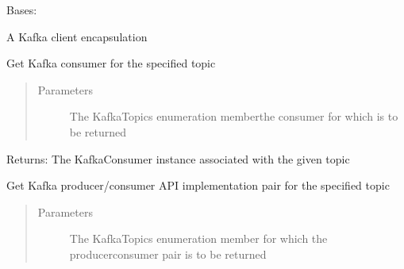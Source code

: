 \documentclass[letterpaper,10pt,english]{sphinxmanual}
\begin{document}

\begin{fulllineitems}
\label{\detokenize{Forge:Forge.KafkaClient}}
\sphinxAtStartPar
Bases: 

\sphinxAtStartPar
A Kafka client encapsulation

\begin{fulllineitems}
\label{\detokenize{Forge:Forge.KafkaClient.get_consumer}}
\sphinxAtStartPar
Get Kafka consumer for the specified topic
\begin{quote}\begin{description}
\item[{Parameters}] \leavevmode
\sphinxAtStartPar
{} \textendash{} The KafkaTopics enumeration member\textendash{}the consumer for which is to be returned

\end{description}\end{quote}

\sphinxAtStartPar
Returns: The KafkaConsumer instance associated with the given topic

\end{fulllineitems}


\begin{fulllineitems}
\label{\detokenize{Forge:Forge.KafkaClient.get_kafka_api_impl_pair}}
\sphinxAtStartPar
Get Kafka producer/consumer API implementation pair for the specified topic
\begin{quote}\begin{description}
\item[{Parameters}] \leavevmode
\sphinxAtStartPar
{} \textendash{} The KafkaTopics enumeration member for which the producer\sphinxhyphen{}consumer pair is to be returned


\end{description}
\end{quote}
\end{fulllineitems}
\end{fulllineitems}
\end{document}
